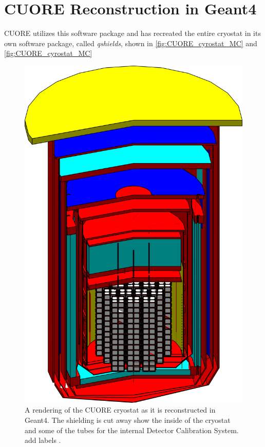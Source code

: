 \section{CUORE Reconstruction in Geant4}
CUORE utilizes this software package and has recreated the entire cryostat in its own software package, called \textit{qshields}, shown in \autoref{fig:CUORE_cyrostat_MC} and \autoref{fig:CUORE_cyrostat_MC}

\begin{figure}[htbp]
    \centering
    \includegraphics[height=0.6\linewidth]{Figures/CUORE_cryostat_MC.png}
    \caption{A rendering of the CUORE cryostat as it is reconstructed in Geant4. The shielding is cut away show the inside of the cryostat and some of the tubes for the internal Detector Calibration System. \color{red} add labels \color{black}.}
    \label{fig:CUORE_cyrostat_MC}
\end{figure}

